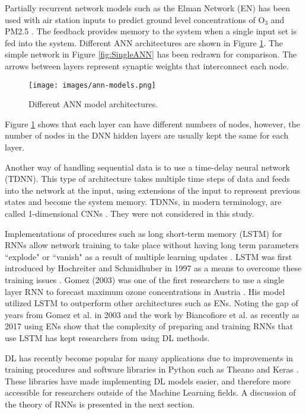 \documentclass[preprint,12pt,a4paper,authoryear]{elsarticle}
\begin{document}
\begin{linenumbers}
Partially recurrent network models such as the Elman Network (EN) has been used  with air station inputs to predict ground level concentrations of O$_{3}$ \citep{Biancofiore2015} and PM2.5 \citep{Biancofiore2017}. The feedback provides memory to the system when a single input set is fed into the system. Different ANN architectures are shown in Figure \ref{fig:ANNmodels}. The simple network in Figure \ref{fig:SingleANN} has been redrawn for comparison.  The arrows between layers represent synaptic weights that interconnect each node.
%
\begin{figure}[H]
\centering
\texttt{[image: images/ann-models.png]} 
\caption{Different ANN model architectures.}
\label{fig:ANNmodels}
\end{figure}
%
Figure \ref{fig:ANNmodels} shows that each layer can have different numbers of nodes, however, the number of nodes in the DNN hidden layers are usually kept the same for each layer. 

Another way of handling sequential data is to use a time-delay neural network (TDNN). This type of architecture takes multiple time steps of data and feeds into the network at the input, using extensions of the input to represent previous states and become the system memory. TDNNs, in modern terminology, are called 1-dimensional CNNs \citep{Goodfellow2016}. They were not considered in this study.

Implementations of procedures such as long short-term memory (LSTM) for RNNs allow network training to take place without having long term parameters ``explode" or ``vanish" as a result of multiple learning updates \citep{Pascanu2013}. LSTM was first introduced by Hochreiter and Schmidhuber in 1997 as a means to overcome these training issues \citep{Hochreiter1997}. Gomez (2003) was one of the first researchers to use a single layer RNN to forecast maximum ozone concentrations in Austria \citep{Gomez2003}. His model utilized LSTM to outperform other architectures such as ENs. Noting the gap of years from Gomez et al. in 2003 and the work by Biancofiore et al. as recently as 2017 using ENs show that the complexity of preparing and training RNNs that use LSTM has kept researchers from using DL methods.

DL has recently become popular for many applications due to improvements in training procedures and software libraries in Python such as Theano \citep{Theano2016} and Keras \citep{keras2015}. These libraries have made implementing DL models easier, and therefore more accessible for researchers outside of the Machine Learning fields. A discussion of the theory of RNNs is presented in the next section.


\end{linenumbers}
\end{document}
